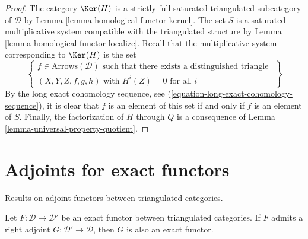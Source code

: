 \begin{proof}
The category $\Ker(H)$ is a strictly full saturated triangulated
subcategory of $\mathcal{D}$ by
Lemma \ref{lemma-homological-functor-kernel}.
The set $S$ is a saturated multiplicative system compatible with the
triangulated structure by
Lemma \ref{lemma-homological-functor-localize}.
Recall that the multiplicative system corresponding to
$\Ker(H)$ is the set
$$
\left\{
\begin{matrix}
f \in \text{Arrows}(\mathcal{D})
\text{ such that there exists a distinguished triangle }\\
(X, Y, Z, f, g, h)\text{ with } H^i(Z) = 0 \text{ for all }i
\end{matrix}
\right\}
$$
By the long exact cohomology sequence, see
(\ref{equation-long-exact-cohomology-sequence}),
it is clear that $f$ is an element of this set if and only if $f$ is
an element of $S$. Finally, the factorization of $H$ through $Q$ is a
consequence of
Lemma \ref{lemma-universal-property-quotient}.
\end{proof}










\section{Adjoints for exact functors}
\label{section-adjoints}

\noindent
Results on adjoint functors between triangulated categories.

\begin{lemma}
\label{lemma-adjoint-is-exact}
Let $F : \mathcal{D} \to \mathcal{D}'$ be an exact functor between
triangulated categories. If $F$ admits a right adjoint
$G: \mathcal{D'} \to \mathcal{D}$, then $G$ is also an exact functor.
\end{lemma}


